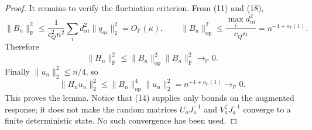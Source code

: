 \documentclass{article}
\begin{document}
\begin{proof}
It remains to verify the fluctuation criterion.  From (11) and (18),
\[
 \|B_n\|_{\mathrm F}^2
 \le \frac1{c_Q^2n^2}\sum_i d_{ni}^2\|q_{ni}\|_2^2
 =O_{\mathbb P}(\kappa),
 \qquad
 \|B_n\|_{\mathrm{op}}^2
 \le \frac{\max_i d_{ni}^2}{c_Qn}=n^{-1+o_{\mathbb P}(1)}.
\]
Therefore
\[
 \|H_n\|_{\mathrm F}^2
 \le\|B_n\|_{\mathrm{op}}^2\|B_n\|_{\mathrm F}^2
 \longrightarrow_{\mathbb P}0.
\]
Finally \(\|u_n\|_2^2\le n/4\), so
\[
 \|H_nu_n\|_2^2
 \le\|B_n\|_{\mathrm{op}}^4\|u_n\|_2^2
 =n^{-1+o_{\mathbb P}(1)}\longrightarrow_{\mathbb P}0.
\]
This proves the lemma.  Notice that (14) supplies only bounds on the augmented response; it does not make the random matrices \(U_aJ_a^{-1}\) and \(V_a^{\zeta}J_a^{-1}\) converge to a finite deterministic state.  No such convergence has been used.
\end{proof}
\end{document}
